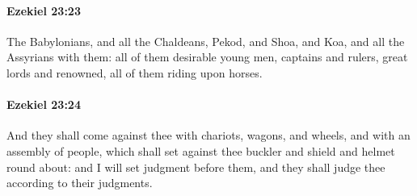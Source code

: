 		\paragraph{Ezekiel 23:23} %
			\label{EZEKIEL-23-23}

			The Babylonians, and all the Chaldeans, Pekod, and Shoa, and Koa, and all the Assyrians with them: all of them desirable young men, captains and rulers, great lords and renowned, all of them riding upon horses.


		\paragraph{Ezekiel 23:24} %
			\label{EZEKIEL-23-24}

			And they shall come against thee with chariots, wagons, and wheels, and with an assembly of people, which shall set against thee buckler and shield and helmet round about: and I will set judgment before them, and they shall judge thee according to their judgments.

